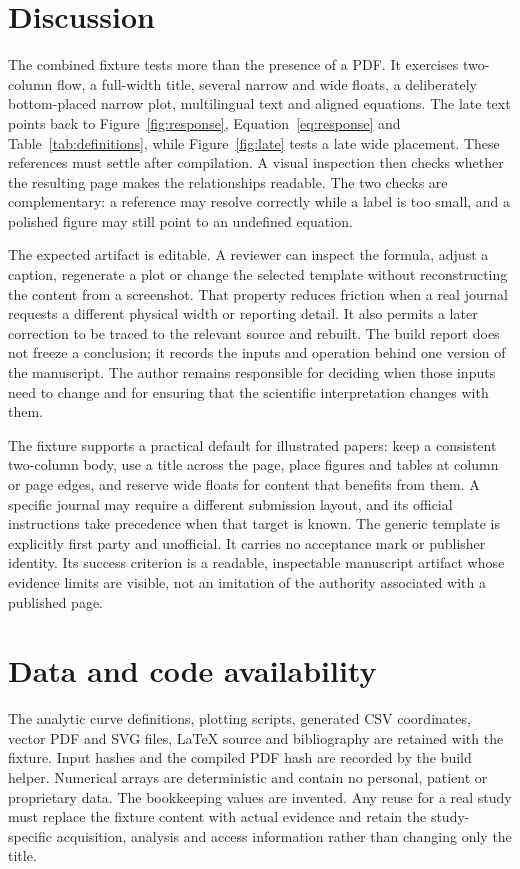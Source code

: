 \section{Discussion}
The combined fixture tests more than the presence of a PDF. It exercises two-column flow, a full-width title, several narrow and wide floats, a deliberately bottom-placed narrow plot, multilingual text and aligned equations. The late text points back to Figure~\ref{fig:response}, Equation~\eqref{eq:response} and Table~\ref{tab:definitions}, while Figure~\ref{fig:late} tests a late wide placement. These references must settle after compilation. A visual inspection then checks whether the resulting page makes the relationships readable. The two checks are complementary: a reference may resolve correctly while a label is too small, and a polished figure may still point to an undefined equation.

The expected artifact is editable. A reviewer can inspect the formula, adjust a caption, regenerate a plot or change the selected template without reconstructing the content from a screenshot. That property reduces friction when a real journal requests a different physical width or reporting detail. It also permits a later correction to be traced to the relevant source and rebuilt. The build report does not freeze a conclusion; it records the inputs and operation behind one version of the manuscript. The author remains responsible for deciding when those inputs need to change and for ensuring that the scientific interpretation changes with them.

The fixture supports a practical default for illustrated papers: keep a consistent two-column body, use a title across the page, place figures and tables at column or page edges, and reserve wide floats for content that benefits from them. A specific journal may require a different submission layout, and its official instructions take precedence when that target is known. The generic template is explicitly first party and unofficial. It carries no acceptance mark or publisher identity. Its success criterion is a readable, inspectable manuscript artifact whose evidence limits are visible, not an imitation of the authority associated with a published page.

\section*{Data and code availability}
The analytic curve definitions, plotting scripts, generated CSV coordinates, vector PDF and SVG files, LaTeX source and bibliography are retained with the fixture. Input hashes and the compiled PDF hash are recorded by the build helper. Numerical arrays are deterministic and contain no personal, patient or proprietary data. The bookkeeping values are invented. Any reuse for a real study must replace the fixture content with actual evidence and retain the study-specific acquisition, analysis and access information rather than changing only the title.

